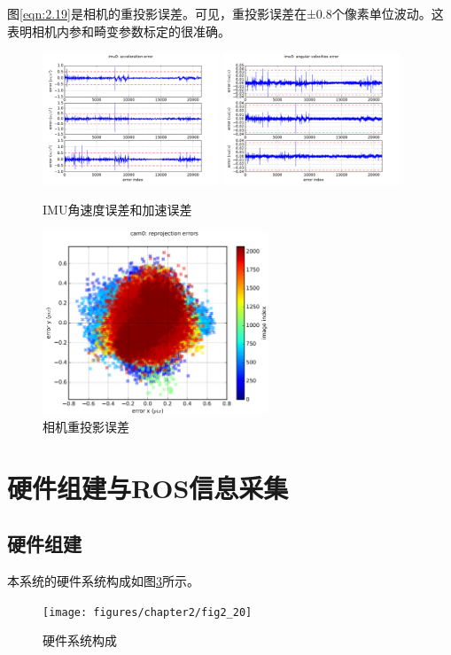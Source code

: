 图\ref{eqn:2.19}是相机的重投影误差。可见，重投影误差在±0.8个像素单位波动。这表明相机内参和畸变参数标定的很准确。
\begin{figure}[!h]\setlength{\belowcaptionskip}{-12pt}
	\centering
	\includegraphics[width=0.47\textwidth]{figures/chapter2/fig2_18(a)}
	\hspace{0.01cm}
	\includegraphics[width=0.47\textwidth]{figures/chapter2/fig2_18(b)}
	\caption{IMU角速度误差和加速误差}
	\label{fig2_18}
\end{figure}
\begin{figure}[!h]\setlength{\belowcaptionskip}{-12pt}
	\centering
	\includegraphics[width=0.6\textwidth]{figures/chapter2/fig2_19}
	\caption{相机重投影误差}\label{fig2_19}
\end{figure}
\section{硬件组建与ROS信息采集}
\subsection{硬件组建}
本系统的硬件系统构成如图\ref{fig2_20}所示。
\begin{figure}[h]\setlength{\belowcaptionskip}{-12pt}
	\centering
	\texttt{[image: figures/chapter2/fig2\_20]}
	\caption{硬件系统构成}\label{fig2_20}
\end{figure}

